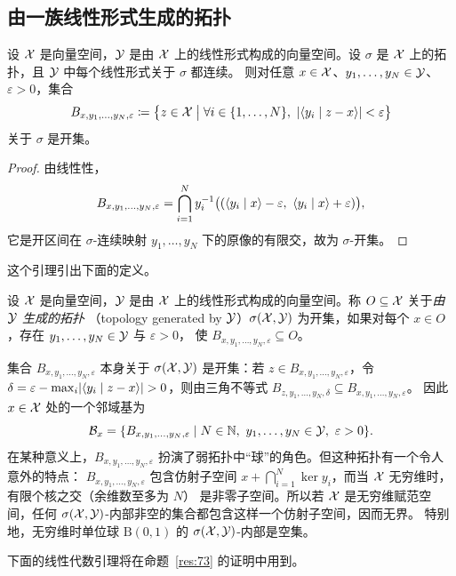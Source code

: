\subsection{由一族线性形式生成的拓扑}

\begin{lemma}
\label{res:72}
设 $\mathcal{X}$ 是向量空间，$\mathcal{Y}$ 是由 $\mathcal{X}$ 上的线性形式构成的向量空间。设 $\sigma$ 是 $\mathcal{X}$ 上的拓扑，且 $\mathcal{Y}$ 中每个线性形式关于 $\sigma$ 都连续。
则对任意 $x\in\mathcal{X}$、$y_1,\dots,y_N\in\mathcal{Y}$、$\varepsilon>0$，集合
\[
  B_{x,y_1,\dots,y_N,\varepsilon}\coloneqq\bigl\{z\in\mathcal{X}\bigm|\forall i\in\{1,\dots,N\},\ \lvert \langle y_i \mid z-x\rangle\rvert<\varepsilon\bigr\}
\]
关于 $\sigma$ 是开集。
\end{lemma}

\begin{proof}
由线性性，
\[
  B_{x,y_1,\dots,y_N,\varepsilon}=\bigcap_{i=1}^N y_i^{-1}\bigl((\pair{y_i}{x}-\varepsilon,\ \pair{y_i}{x}+\varepsilon)\bigr),
\]
它是开区间在 $\sigma$-连续映射 $y_1,\dots,y_N$ 下的原像的有限交，故为 $\sigma$-开集。
\end{proof}

这个引理引出下面的定义。

\begin{definition}[由线性形式生成的拓扑]
\label{def:37}
设 $\mathcal{X}$ 是向量空间，$\mathcal{Y}$ 是由 $\mathcal{X}$ 上的线性形式构成的向量空间。称 $O\subseteq\mathcal{X}$ 关于\emph{由 $\mathcal{Y}$ 生成的拓扑}
（topology generated by $\mathcal{Y}$）$\sigma(\mathcal{X},\mathcal{Y})$ 为开集，如果对每个 $x\in O$，存在 $y_1,\dots,y_N\in\mathcal{Y}$ 与 $\varepsilon>0$，
使 $B_{x,y_1,\dots,y_N,\varepsilon}\subseteq O$。
\end{definition}

集合 $B_{x,y_1,\dots,y_N,\varepsilon}$ 本身关于 $\sigma(\mathcal{X},\mathcal{Y})$ 是开集：若 $z\in B_{x,y_1,\dots,y_N,\varepsilon}$，令
$\delta=\varepsilon-\max_i\lvert \langle y_i \mid z-x\rangle\rvert>0$，则由三角不等式 $B_{z,y_1,\dots,y_N,\delta}\subseteq B_{x,y_1,\dots,y_N,\varepsilon}$。
因此 $x\in\mathcal{X}$ 处的一个邻域基为
\[
  \mathcal{B}_x=\{B_{x,y_1,\dots,y_N,\varepsilon}\mid N\in\mathbb{N},\ y_1,\dots,y_N\in\mathcal{Y},\ \varepsilon>0\}.
\]
在某种意义上，$B_{x,y_1,\dots,y_N,\varepsilon}$ 扮演了弱拓扑中“球”的角色。但这种拓扑有一个令人意外的特点：
$B_{x,y_1,\dots,y_N,\varepsilon}$ 包含仿射子空间 $x+\bigcap_{i=1}^N\ker y_i$，而当 $\mathcal{X}$ 无穷维时，有限个核之交（余维数至多为 $N$）
是非零子空间。所以若 $\mathcal{X}$ 是无穷维赋范空间，任何 $\sigma(\mathcal{X},\mathcal{Y})$-内部非空的集合都包含这样一个仿射子空间，因而无界。
特别地，无穷维时单位球 $\mathrm{B}(0,1)$ 的 $\sigma(\mathcal{X},\mathcal{Y})$-内部是空集。

下面的线性代数引理将在命题~\ref{res:73} 的证明中用到。

